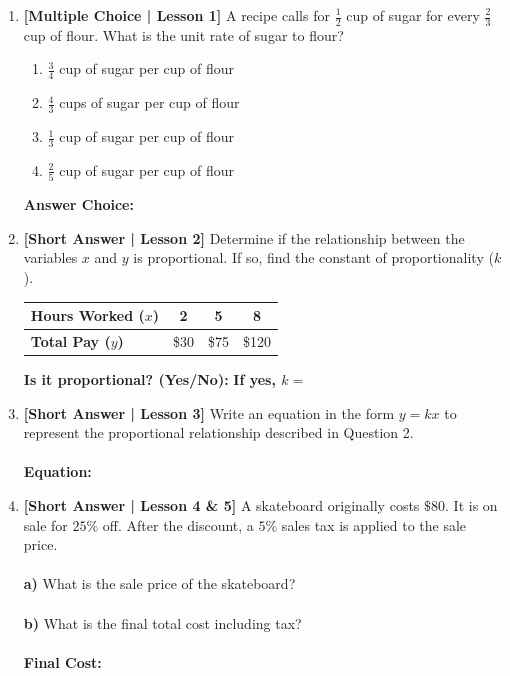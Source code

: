 \documentclass[12pt, letterpaper, fleqn]{article}
\newcommand{\blankshorter}{\underline{\hspace{2.0cm}}}
\newcommand{\blanklong}{\underline{\hspace{6.5cm}}}
\begin{document}
\begin{enumerate}[leftmargin=0.6cm, itemsep=\fill]

\item \textbf{[Multiple Choice | Lesson 1]} A recipe calls for $\frac{1}{2}$ cup of sugar for every $\frac{2}{3}$ cup of flour. What is the unit rate of sugar to flour?
\begin{enumerate}[label=\Alph*)]
    \item $\frac{3}{4}$ cup of sugar per cup of flour
    \item $\frac{4}{3}$ cups of sugar per cup of flour
    \item $\frac{1}{3}$ cup of sugar per cup of flour
    \item $\frac{2}{5}$ cup of sugar per cup of flour
\end{enumerate}
\textbf{Answer Choice:} \blankshorter

\item \textbf{[Short Answer | Lesson 2]} Determine if the relationship between the variables $x$ and $y$ is proportional. If so, find the constant of proportionality ($k$).
\begin{center}
\renewcommand{\arraystretch}{1.3}
\begin{tabular}{|l|c|c|c|}
\hline
\textbf{Hours Worked ($x$)} & 2 & 5 & 8 \\ \hline
\textbf{Total Pay ($y$)} & \$30 & \$75 & \$120 \\ \hline
\end{tabular}
\end{center}
\textbf{Is it proportional? (Yes/No):} \blankshorter \quad \textbf{If yes, $k =$} \blankshorter

\item \textbf{[Short Answer | Lesson 3]} Write an equation in the form $y = kx$ to represent the proportional relationship described in Question 2.
\\ \\
\textbf{Equation:} \blanklong

\item \textbf{[Short Answer | Lesson 4 \& 5]} A skateboard originally costs $\$80$. It is on sale for $25\%$ off. After the discount, a $5\%$ sales tax is applied to the sale price.
\\ \\
\textbf{a)} What is the sale price of the skateboard? \blankshorter \\ \\
\textbf{b)} What is the final total cost including tax?
\\ \\
\textbf{Final Cost:} \blanklong

\end{enumerate}
\vspace{0.5cm}
\end{document}
